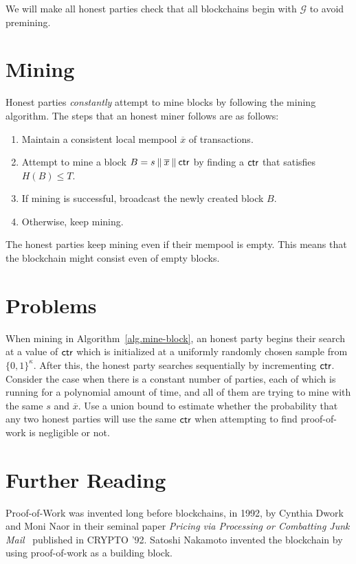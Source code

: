 We will make all honest parties check that all blockchains begin with $\mathcal{G}$ to avoid
premining. 

\section{Mining}

Honest parties \emph{constantly} attempt to mine blocks by following the mining algorithm.
The steps that an honest miner follows are as follows:

\begin{enumerate}
  \item Maintain a consistent local mempool $\overline{x}$ of transactions.
  \item Attempt to mine a block $B = s \mathbin{\|} \overline{x} \mathbin{\|} \mathsf{ctr}$ by finding a $\mathsf{ctr}$ that satisfies $H(B) \leq T$.
  \item If mining is successful, broadcast the newly created block $B$.
  \item Otherwise, keep mining.
\end{enumerate}

The honest parties keep mining even if their mempool is empty. This means that the blockchain
might consist even of empty blocks.

\section*{Problems}

\begin{problems}
  \item When mining in Algorithm~\ref{alg.mine-block}, an honest party begins their search at a
        value of $\mathsf{ctr}$ which is initialized at a uniformly randomly chosen sample from $\{0, 1\}^\kappa$.
        After this, the honest party searches sequentially by incrementing $\mathsf{ctr}$.
        Consider the case when there is a constant number of parties, each of which is running for a
        polynomial amount of time, and all of them are trying to mine with the same $s$ and $\overline{x}$.
        Use a union bound to estimate whether the probability that any two honest parties will use
        the same $\mathsf{ctr}$ when attempting to find proof-of-work is negligible or not.
\end{problems}

\section*{Further Reading}

Proof-of-Work was invented long before blockchains, in 1992, by Cynthia Dwork and Moni Naor
in their seminal paper \emph{Pricing via Processing or Combatting Junk Mail}~\cite{pow} published
in CRYPTO '92. Satoshi Nakamoto invented the blockchain by using proof-of-work as a building block.
